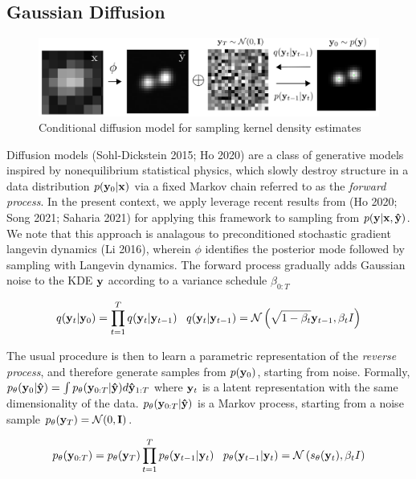 \documentclass{article}
\begin{document}
\subsection{Gaussian Diffusion}

\begin{figure}
\includegraphics[scale=4.5]{Denoise.png}
\caption{Conditional diffusion model for sampling kernel density estimates}
\end{figure}

Diffusion models (Sohl-Dickstein 2015; Ho 2020) are a class of generative models inspired by nonequilibrium statistical physics, which slowly destroy structure in a data distribution $p(\bold{y}_{0}|\bold{x})$ via a fixed Markov chain referred to as the \emph{forward process}. In the present context, we apply leverage recent results from (Ho 2020; Song 2021; Saharia 2021) for applying this framework to sampling from $p(\bold{y}|\bold{x},\bold{\hat{y}})$. We note that this approach is analagous to preconditioned stochastic gradient langevin dynamics (Li 2016), wherein $\phi$ identifies the posterior mode followed by sampling with Langevin dynamics. The forward process gradually adds Gaussian noise to the KDE $\bold{y}$ according to a variance schedule $\beta_{0:T}$

\begin{equation}
q(\bold{y}_{t}|\bold{y}_{0}) = \prod_{t=1}^{T}q(\bold{y}_{t}|\bold{y}_{t-1}) \;\;\; q(\bold{y}_{t}|\bold{y}_{t-1}) = \mathcal{N}\left(\sqrt{1-\beta_{t}}\bold{y}_{t-1},\beta_t I\right)
\end{equation}

The usual procedure is then to learn a parametric representation of the \emph{reverse process}, and therefore generate samples from  $p(\bold{y}_{0})$, starting from noise. Formally, $p_{\theta}(\bold{y}_{0}|\bold{\hat{y}}) = \int p_{\theta}(\bold{y}_{0:T}|\bold{\hat{y}})d\bold{\hat{y}}_{1:T}$ where $\bold{y}_{t}$ is a latent representation with the same dimensionality of the data.  $p_{\theta}(\bold{y}_{0:T}|\bold{\hat{y}})$ is a Markov process, starting from a noise sample $p_{\theta}(\bold{y}_{T}) = \mathcal{N}(0,\bold{I})$. 

\begin{equation}
p_{\theta}(\bold{y}_{0:T}) = p_{\theta}(\bold{y}_{T})\prod_{t=1}^{T} p_{\theta}(\bold{y}_{t-1}|\bold{y}_{t}) \;\;\; p_{\theta}(\bold{y}_{t-1}|\bold{y}_{t}) = \mathcal{N}\left(s_{\theta}(\bold{y}_{t}),\beta_{t}I\right)
\end{equation}
\end{document}
